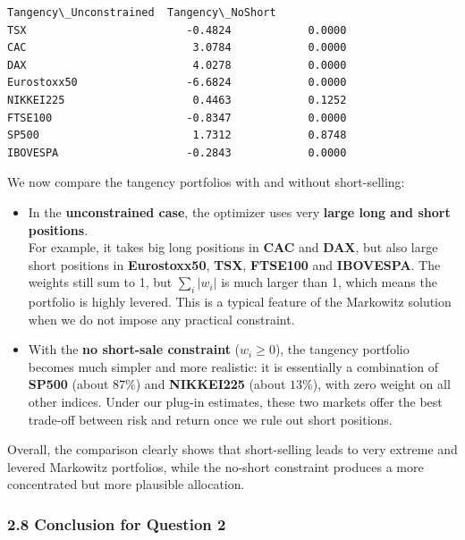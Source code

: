 \documentclass[11pt]{article}
\begin{document}
            \begin{tcolorbox}[breakable, size=fbox, boxrule=.5pt, pad at break*=1mm, opacityfill=0]
\begin{Verbatim}[commandchars=\\\{\}]
             Tangency\_Unconstrained  Tangency\_NoShort
TSX                         -0.4824            0.0000
CAC                          3.0784            0.0000
DAX                          4.0278            0.0000
Eurostoxx50                 -6.6824            0.0000
NIKKEI225                    0.4463            0.1252
FTSE100                     -0.8347            0.0000
SP500                        1.7312            0.8748
IBOVESPA                    -0.2843            0.0000
\end{Verbatim}
\end{tcolorbox}
        
    We now compare the tangency portfolios with and without short-selling:

\begin{itemize}
\item
  In the \textbf{unconstrained case}, the optimizer uses very
  \textbf{large long and short positions}.\\
  For example, it takes big long positions in \textbf{CAC} and
  \textbf{DAX}, but also large short positions in \textbf{Eurostoxx50},
  \textbf{TSX}, \textbf{FTSE100} and \textbf{IBOVESPA}. The weights
  still sum to 1, but \(\sum_i |w_i|\) is much larger than 1, which
  means the portfolio is highly levered. This is a typical feature of
  the Markowitz solution when we do not impose any practical constraint.
\item
  With the \textbf{no short-sale constraint} (\(w_i \ge 0\)), the
  tangency portfolio becomes much simpler and more realistic: it is
  essentially a combination of \textbf{SP500} (about \(87\%\)) and
  \textbf{NIKKEI225} (about \(13\%\)), with zero weight on all other
  indices. Under our plug-in estimates, these two markets offer the best
  trade-off between risk and return once we rule out short positions.
\end{itemize}

Overall, the comparison clearly shows that short-selling leads to very
extreme and levered Markowitz portfolios, while the no-short constraint
produces a more concentrated but more plausible allocation.

    \hypertarget{conclusion-for-question-2}{%
\subsubsection{2.8 Conclusion for Question
2}\label{conclusion-for-question-2}}
\end{document}
